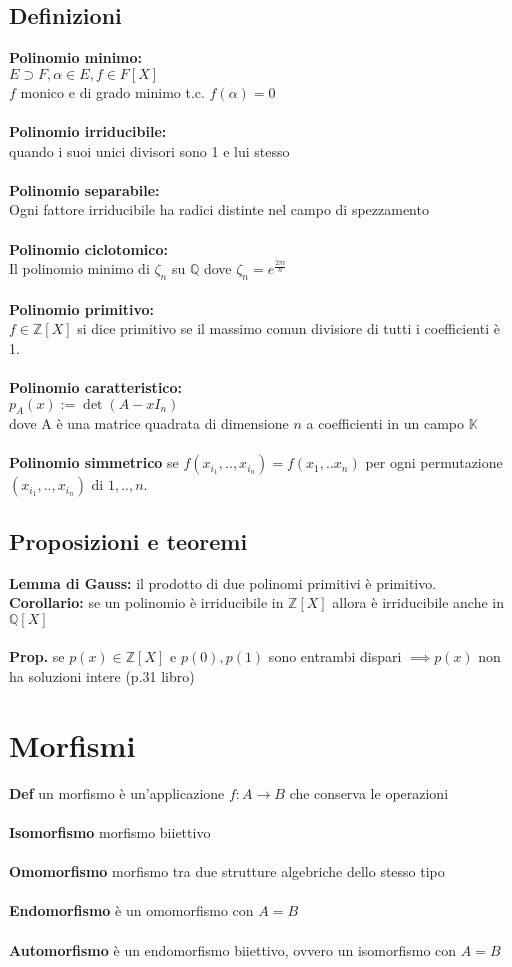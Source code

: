 \documentclass[10pt,a4paper]{article}
\begin{document}
\subsection{Definizioni}
\textbf{Polinomio minimo:}\\
$E \supset F, \alpha \in E,f \in F[X]$\\
$f$ monico e di grado minimo t.c. $f(\alpha)=0$\\\\
\textbf{Polinomio irriducibile:}\\quando i suoi unici divisori sono 1 e lui stesso \\\\
\textbf{Polinomio separabile:} \\Ogni fattore irriducibile ha radici distinte nel campo di spezzamento\\\\
\textbf{Polinomio ciclotomico:}\\
Il polinomio minimo di $\zeta_n$ su $\mathbb{Q}$ dove $\zeta_n = e^{\frac{2\pi i}{n}}$\\\\
\textbf{Polinomio primitivo:}\\
$f\in \mathbb{Z}[X]$ si dice primitivo se il massimo comun divisiore di tutti i coefficienti è 1.\\\\
\textbf{Polinomio caratteristico:}\\
$p_A(x) := \det(A-xI_n)$\\
dove A è una matrice quadrata di dimensione $n$ a coefficienti in un campo $\mathbb{K}$\\\\
\textbf{Polinomio simmetrico} se $f(x_{i_1},..,x_{i_n}) = f(x_1,..x_n)$ per ogni permutazione $(x_{i_1},..,x_{i_n})$ di $1,..,n$.
\subsection{Proposizioni e teoremi}
\textbf{Lemma di Gauss:} il prodotto di due polinomi primitivi è primitivo. \\
\textbf{Corollario:} se un polinomio è irriducibile in $\mathbb{Z}[X]$ allora è irriducibile anche in $\mathbb{Q}[X]$\\\\
\textbf{Prop.} se $p(x) \in \mathbb{Z}[X]$ e $p(0),p(1)$ sono entrambi dispari $\implies p(x)$ non ha soluzioni intere (p.31 libro)
\newpage
\section{Morfismi}
\textbf{Def} un morfismo è un'applicazione $f: A \to B$ che conserva le operazioni\\\\
\textbf{Isomorfismo} morfismo biiettivo\\\\
\textbf{Omomorfismo} morfismo tra due strutture algebriche dello stesso tipo \\\\
\textbf{Endomorfismo} è un omomorfismo con $A=B$\\\\
\textbf{Automorfismo} è un endomorfismo biiettivo, ovvero un isomorfismo con $A=B$\\
\end{document}
